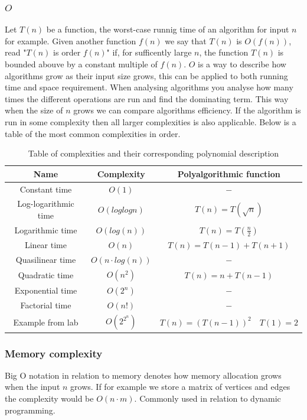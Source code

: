 \documentclass[12pt]{article} %
\begin{document}
\subsubsection{$O$}
Let $T(n)$ be a function, the worst-case runnig time of an algorithm for input $n$ for example. Given another function $f(n)$ we say that $T(n)$ is $O(f(n))$, read "$T(n)$ is order $f(n)$" if, for sufficently large $n$, the function $T(n)$ is bounded abouve by a constant multiple of $f(n)$. 
$O$ is a way to describe how algorithms grow as their input size grows, this can be applied to both running time and space requirement. When analysing algorithms you analyse how many times the different operations are run and find the dominating term. This way when the size of $n$ grows we can compare algorithms efficiency. If the algorithm is run in some complexity then all larger complexities is also applicable. Below is a table of the most common complexities in order.

\begin{table}[H]
\centering
\begin{tabular}{| c | c | c |}
    \hline
    Name & Complexity & Polyalgorithmic function \\
    \hline \hline
    Constant time & $O(1)$ & $-$ \\
    Log-logarithmic time & $O(log log n)$ & $T(n) = T(\sqrt{n})$\\
    Logarithmic time & $O(log(n))$ & $T(n) = T(\frac{n}{2})$ \\
    Linear time & $O(n)$ & $T(n) = T(n - 1) + T(n + 1)$ \\
    Quasilinear time & $O(n \cdot log(n))$ & $-$ \\
    Quadratic time & $O(n^2)$ & $T(n) = n + T(n -1)$ \\
    Exponential time & $O(2^n)$ & $-$ \\
    Factorial time & $O(n!)$ & $-$\\
    Example from lab & $O(2^{2^{n}})$ & $T(n) = (T(n-1))^2 \quad T(1) = 2$ \\
    \hline
\end{tabular}
\caption{Table of complexities and their corresponding polynomial description}
\label{table: 2}
\end{table}

\subsubsection{Memory complexity}
Big O notation in relation to memory denotes how memory allocation grows when the input $n$ grows. If for example we store a matrix of vertices and edges the complexity would be $O(n \cdot m)$. Commonly used in relation to dynamic programming.
\end{document}
